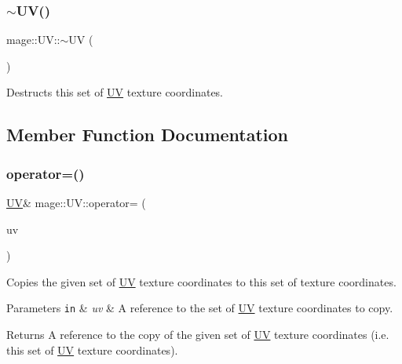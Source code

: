 \subsubsection{\texorpdfstring{$\sim$\+U\+V()}{~UV()}}
{\footnotesize\ttfamily mage\+::\+U\+V\+::$\sim$\+UV (\begin{DoxyParamCaption}{ }\end{DoxyParamCaption})\hspace{0.3cm}{\ttfamily [default]}}

Destructs this set of \hyperlink{structmage_1_1_u_v}{UV} texture coordinates. 

\subsection{Member Function Documentation}
\hypertarget{structmage_1_1_u_v_a3ef9497749cc5a99285b110d3f5a59aa}{}\label{structmage_1_1_u_v_a3ef9497749cc5a99285b110d3f5a59aa} 
\subsubsection{\texorpdfstring{operator=()}{operator=()}\hspace{0.1cm}{\footnotesize\ttfamily [1/2]}}
{\footnotesize\ttfamily \hyperlink{structmage_1_1_u_v}{UV}\& mage\+::\+U\+V\+::operator= (\begin{DoxyParamCaption}\item[{const \hyperlink{structmage_1_1_u_v}{UV} \&}]{uv }\end{DoxyParamCaption})\hspace{0.3cm}{\ttfamily [default]}}

Copies the given set of \hyperlink{structmage_1_1_u_v}{UV} texture coordinates to this set of texture coordinates.


\begin{DoxyParams}[1]{Parameters}
\mbox{\tt in}  & {\em uv} & A reference to the set of \hyperlink{structmage_1_1_u_v}{UV} texture coordinates to copy. \\
\hline
\end{DoxyParams}
\begin{DoxyReturn}{Returns}
A reference to the copy of the given set of \hyperlink{structmage_1_1_u_v}{UV} texture coordinates (i.\+e. this set of \hyperlink{structmage_1_1_u_v}{UV} texture coordinates). 
\end{DoxyReturn}
\hypertarget{structmage_1_1_u_v_ab3a52afacb7c0b6e8f702888f66847f9}{}\label{structmage_1_1_u_v_ab3a52afacb7c0b6e8f702888f66847f9} 
